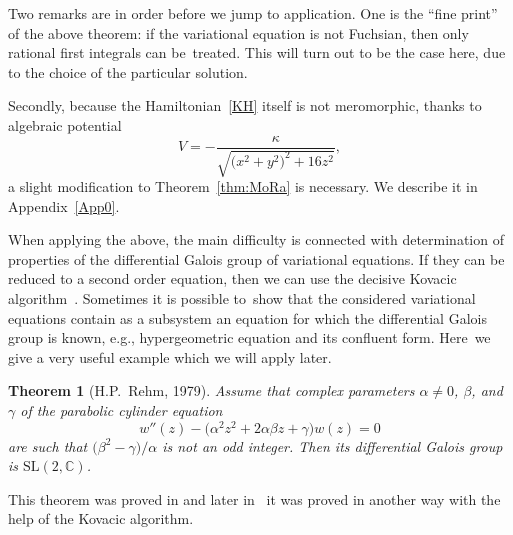 \documentclass[pdftex]{sigma}
\numberwithin{equation}{section}
\newtheorem{Theorem}{Theorem}[section]
\begin{document}
Two remarks are in order before we jump to application. One is the
``fine print'' of the above theorem: if the variational equation is
not Fuchsian, then only rational first integrals can be~treated. This
will turn out to be the case here, due to the choice of the particular
solution.

Secondly, because the Hamiltonian~\eqref{KH} itself is not
meromorphic, thanks to algebraic potential
\begin{equation*} %
 V= - \frac{\kappa}{\sqrt{\big(x^2+y^2\big)^2+{16}z^2}},
\end{equation*}
a slight modification to Theorem~\ref{thm:MoRa} is necessary. We describe it in Appendix~\ref{App0}.

When applying the above, the main difficulty is connected
with determination of properties of the differential Galois group of
variational equations. If they can be reduced to a second order equation, then we can use the decisive Kovacic
algorithm~\cite{3}. Sometimes it is possible to~show that the
considered variational equations contain as a subsystem an equation
for which the differential Galois group is known, e.g., hypergeometric
equation and its confluent form. Here~we give a very useful example
which we will apply later.
\begin{Theorem}[H.P.~Rehm, 1979] \label{thm:par}
 Assume that complex parameters $\alpha\neq 0$, $\beta$, and $\gamma$
 of the parabolic cylinder equation
 \begin{equation} \label{eq:5}
 w''(z) - \big(\alpha^2 z^2 +2 \alpha \beta z + \gamma\big) w(z)=0
 \end{equation}
 are such that $\big(\beta^2-\gamma\big)/\alpha$ is not an odd integer. Then
 its differential Galois group is $\mathrm{SL}(2,\mathbb{C})$.
\end{Theorem}
This theorem was proved in \cite{Rehm} and later in~\cite{baby} it was
proved in another way with the help of the Kovacic algorithm.
\end{document}
